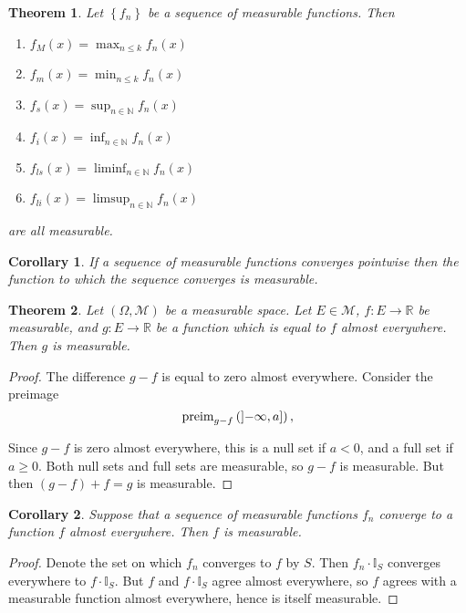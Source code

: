 \documentclass[a4paper,12pt]{scrreprt}
\newcommand{\R}{\mathbb{R}}
\newcommand{\N}{\mathbb{N}}
\theoremstyle{definition}
\theoremstyle{plain}
\newtheorem{theorem}{Theorem}[section]
\newtheorem{corollary}{Corollary}[section]
\theoremstyle{remark}
\begin{document}
\begin{theorem}
  \label{thm:limitsoffunctionsaremeasurable}
  Let $\left\{ f_{n} \right\}$ be a sequence of measurable functions. Then
  \begin{enumerate}
    \item $f_{M}(x) = \max_{n \leq k} f_{n}(x)$

    \item $f_{m}(x) = \min_{n \leq k} f_{n}(x)$

    \item $f_{s}(x) = \sup_{n \in \N} f_{n}(x)$

    \item $f_{i}(x) = \inf_{n \in \N} f_{n}(x)$

    \item $f_{ls}(x) = \liminf_{n \in \N} f_{n}(x)$

    \item $f_{li}(x) = \limsup_{n \in \N} f_{n}(x)$
  \end{enumerate}
  are all measurable.
\end{theorem}

\begin{corollary}
  If a sequence of measurable functions converges pointwise then the function to which the sequence converges is measurable.
\end{corollary}

\begin{theorem}
  Let $(\Omega, \mathcal{M})$ be a measurable space. Let $E \in \mathcal{M}$, $f\colon E \to \R$ be measurable, and $g\colon E \to \R$ be a function which is equal to $f$ almost everywhere. Then $g$ is measurable.
\end{theorem}
\begin{proof}
  The difference $g - f$ is equal to zero almost everywhere. Consider the preimage
  \begin{equation*}
  \mathrm{preim}_{g-f}\left( \interval[open left]{-\infty}{a} \right),
\end{equation*}

Since $g - f$ is zero almost everywhere, this is a null set if $a < 0$, and a full set if $a \geq 0$. Both null sets and full sets are measurable, so $g - f$ is measurable. But then $(g - f) + f = g$ is measurable.
\end{proof}

\begin{corollary}
  Suppose that a sequence of measurable functions $f_{n}$ converge to a function $f$ almost everywhere. Then $f$ is measurable.
\end{corollary}
\begin{proof}
  Denote the set on which $f_{n}$ converges to $f$ by $S$. Then $f_{n}\cdot\mathbb{I}_{S}$ converges everywhere to $f\cdot\mathbb{I}_{S}$. But $f$ and $f\cdot \mathbb{I}_{S}$ agree almost everywhere, so $f$ agrees with a measurable function almost everywhere, hence is itself measurable.
\end{proof}
\end{document}
